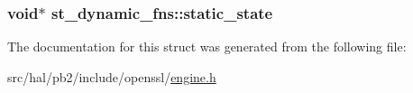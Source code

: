 \subsubsection[{\texorpdfstring{static\+\_\+state}{static_state}}]{\setlength{\rightskip}{0pt plus 5cm}void$\ast$ st\+\_\+dynamic\+\_\+fns\+::static\+\_\+state}\hypertarget{structst__dynamic__fns_abaade597a7f70ea7b75c4ad2f656fb92}{}\label{structst__dynamic__fns_abaade597a7f70ea7b75c4ad2f656fb92}


The documentation for this struct was generated from the following file\+:\begin{DoxyCompactItemize}
\item 
src/hal/pb2/include/openssl/\hyperlink{engine_8h}{engine.\+h}\end{DoxyCompactItemize}
